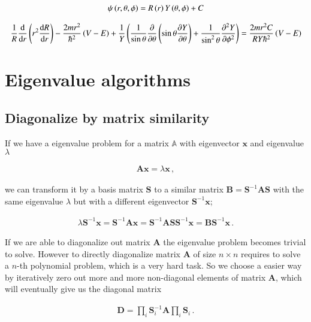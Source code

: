 \documentclass[11pt,english,a4paper]{article}
\begin{document}
\begin{flushleft}
\begin{align*}
\psi\left({r,\theta,\phi}\right) = R\left({r}\right) Y\left({\theta, \phi}\right) + C
\end{align*}

\begin{align*}
\frac{1}{R}\frac{\mathrm{d}}{\mathrm{d}r}\left({r^2 \frac{\mathrm{d} R}{\mathrm{d} r}}\right) - \frac{2m r^2}{\hbar^2}\left({V-E}\right) + \frac{1}{Y}\left({\frac{1}{\sin \theta} \frac{\partial}{\partial \theta}\left({\sin\theta \frac{\partial Y}{\partial \theta}}\right) + \frac{1}{\sin^2\theta}\frac{\partial^2 Y}{\partial \phi^2}}\right) = \frac{2m r^2 C}{R Y \hbar^2}\left({V-E}\right)
\end{align*}

\section{Eigenvalue algorithms}

\subsection{Diagonalize by matrix similarity}\label{sec_Diagonalize}

If we have a eigenvalue problem for a matrix $\mathbb{A}$ with eigenvector $\mathbf{x}$ and eigenvalue $\lambda$

\begin{align*}
\mathbf{A}\mathbf{x} = \lambda \mathbf{x} \,,
\end{align*}

we can transform it by a basis matrix $\mathbf{S}$ to a similar matrix $\mathbf{B} = \mathbf{S}^{-1}\mathbf{A}\mathbf{S}$ with the same eigenvalue $\lambda$ but with a different eigenvector $\mathbf{S}^{-1} \mathbf{x}$;

\begin{align*}
\lambda \mathbf{S}^{-1} \mathbf{x} = \mathbf{S}^{-1}\mathbf{A}\mathbf{x} = \mathbf{S}^{-1}\mathbf{A}\mathbf{S} \mathbf{S}^{-1}\mathbf{x} = \mathbf{B}\mathbf{S}^{-1}\mathbf{x} \,.
\end{align*}

If we are able to diagonalize out matrix $\mathbf{A}$ the eigenvalue problem becomes trivial to solve. However to directly diagonalize matrix $\mathbf{A}$ of size $n\times n$ requires to solve a $n$-th polynomial problem, which is a very hard task. So we choose a easier way by iteratively zero out more and more non-diagonal elements of matrix $\mathbf{A}$, which will eventually give us the diagonal matrix

\begin{align*}
\mathbf{D} = \prod_i \mathbf{S}_i^{-1} \mathbf{A} \prod_i \mathbf{S}_i\,.
\end{align*}


\end{flushleft}
\end{document}
